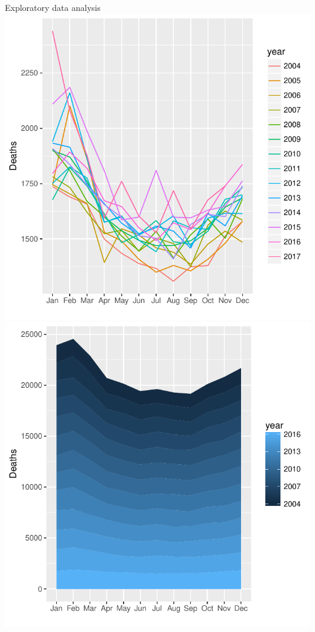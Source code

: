 \documentclass[12pt,aspectratio=169]{beamer}
\begin{document}
\begin{frame}{Exploratory data analysis}
    \centering%
    \includegraphics[height=0.8\textheight]{figures/total_deaths_by_month_and_year}
    \hspace{2em}
    \includegraphics[height=0.8\textheight]{figures/total_cumulative_deaths_by_month}
\end{frame}
\end{document}

